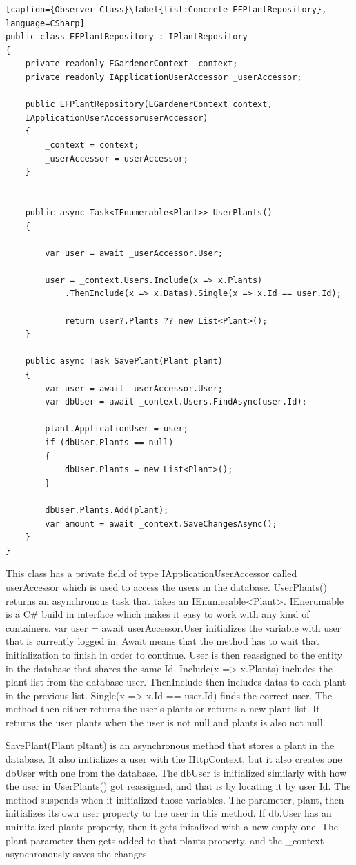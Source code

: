 \documentclass[a4paper,12pt,twoside,openright,titlepage]{book}
\begin{document}
\begin{lstlisting}[caption={Observer Class}\label{list:Concrete EFPlantRepository}, language=CSharp]
public class EFPlantRepository : IPlantRepository
{
	private readonly EGardenerContext _context;
    private readonly IApplicationUserAccessor _userAccessor;

	public EFPlantRepository(EGardenerContext context,
	IApplicationUserAccessoruserAccessor)
	{
		_context = context;
        _userAccessor = userAccessor;
	}

        
	public async Task<IEnumerable<Plant>> UserPlants()
	{

		var user = await _userAccessor.User;
            
		user = _context.Users.Include(x => x.Plants)
			.ThenInclude(x => x.Datas).Single(x => x.Id == user.Id);
            
            return user?.Plants ?? new List<Plant>();
	}

	public async Task SavePlant(Plant plant)
	{
		var user = await _userAccessor.User;
		var dbUser = await _context.Users.FindAsync(user.Id);

		plant.ApplicationUser = user;
		if (dbUser.Plants == null)
		{
	        dbUser.Plants = new List<Plant>();
        }
            
        dbUser.Plants.Add(plant);
        var amount = await _context.SaveChangesAsync();
	}
}
\end{lstlisting}
This class has a private field of type IApplicationUserAccessor called userAccessor which is used to access the users in the database. UserPlants() returns an asynchronous task that takes an IEnumerable<Plant>. IEnerumable is a C\#  build in interface which makes it easy to work with any kind of containers. var user = await userAccessor.User initializes the variable with user that is currently logged in. Await means that the method has to wait that initialization to finish in order to continue. User is then reassigned to the entity in the database that shares the same Id. Include(x => x.Plants) includes the plant list from the database user. ThenInclude then includes datas to each plant in the previous list. Single(x => x.Id == user.Id) finds the correct user. The method then either returns the user's plants or returns a new plant list. It returns the user plants when the user is not null and plants is also not null.

SavePlant(Plant pltant) is an asynchronous method that stores a plant in the database.  It also initializes a user with the HttpContext, but it also creates one dbUser with one from the database. The dbUser is initialized similarly with how the user in UserPlants() got reassigned, and that is by locating it by user Id. The method suspends when it initialized those variables. The parameter, plant, then initializes its own user property to the user in this method. If db.User has an uninitalized plants property, then it gets initalized with a new empty one. The plant parameter then gets added to that plants property, and the \_context asynchronously saves the changes.  
\end{document}
